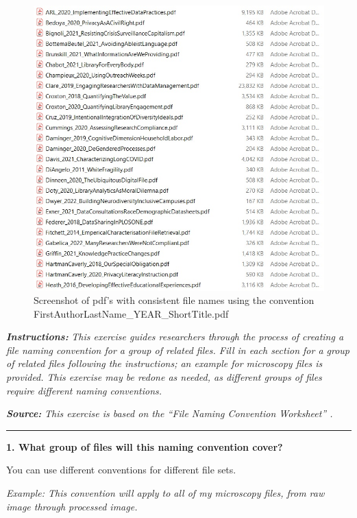 \documentclass[
]{book}
\begin{document}
\begin{figure}
\centering
\includegraphics{images/03_FileNaming.jpg}
\caption{Screenshot of pdf's with consistent file names using the convention FirstAuthorLastName\_YEAR\_ShortTitle.pdf}
\end{figure}

\textbf{\emph{Instructions:}} \emph{This exercise guides researchers through the process of creating a file naming convention for a group of related files. Fill in each section for a group of related files following the instructions; an example for microscopy files is provided. This exercise may be redone as needed, as different groups of files require different naming conventions.}

\textbf{\emph{Source:}} \emph{This exercise is based on the ``File Naming Convention Worksheet'' \citep{briney_file_2020}.}

\begin{center}\rule{0.5\linewidth}{0.5pt}\end{center}

\textbf{1. What group of files will this naming convention cover?}

You can use different conventions for different file sets.

\emph{Example: This convention will apply to all of my microscopy files, from raw image through processed image.}
\end{document}
